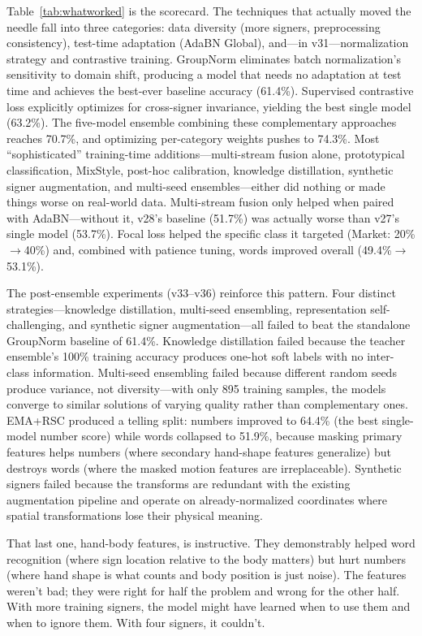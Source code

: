 \documentclass[conference]{IEEEtran}
\begin{document}
Table~\ref{tab:whatworked} is the scorecard. The techniques that actually moved the needle fall into three categories: data diversity (more signers, preprocessing consistency), test-time adaptation (AdaBN Global), and---in v31---normalization strategy and contrastive training. GroupNorm eliminates batch normalization's sensitivity to domain shift, producing a model that needs no adaptation at test time and achieves the best-ever baseline accuracy (61.4\%). Supervised contrastive loss explicitly optimizes for cross-signer invariance, yielding the best single model (63.2\%). The five-model ensemble combining these complementary approaches reaches 70.7\%, and optimizing per-category weights pushes to 74.3\%. Most ``sophisticated'' training-time additions---multi-stream fusion alone, prototypical classification, MixStyle, post-hoc calibration, knowledge distillation, synthetic signer augmentation, and multi-seed ensembles---either did nothing or made things worse on real-world data. Multi-stream fusion only helped when paired with AdaBN---without it, v28's baseline (51.7\%) was actually worse than v27's single model (53.7\%). Focal loss helped the specific class it targeted (Market: 20\%$\to$40\%) and, combined with patience tuning, words improved overall (49.4\%$\to$53.1\%).

The post-ensemble experiments (v33--v36) reinforce this pattern. Four distinct strategies---knowledge distillation, multi-seed ensembling, representation self-challenging, and synthetic signer augmentation---all failed to beat the standalone GroupNorm baseline of 61.4\%. Knowledge distillation failed because the teacher ensemble's 100\% training accuracy produces one-hot soft labels with no inter-class information. Multi-seed ensembling failed because different random seeds produce variance, not diversity---with only 895 training samples, the models converge to similar solutions of varying quality rather than complementary ones. EMA+RSC produced a telling split: numbers improved to 64.4\% (the best single-model number score) while words collapsed to 51.9\%, because masking primary features helps numbers (where secondary hand-shape features generalize) but destroys words (where the masked motion features are irreplaceable). Synthetic signers failed because the transforms are redundant with the existing augmentation pipeline and operate on already-normalized coordinates where spatial transformations lose their physical meaning.

That last one, hand-body features, is instructive. They demonstrably helped word recognition (where sign location relative to the body matters) but hurt numbers (where hand shape is what counts and body position is just noise). The features weren't bad; they were right for half the problem and wrong for the other half. With more training signers, the model might have learned when to use them and when to ignore them. With four signers, it couldn't.
\end{document}
